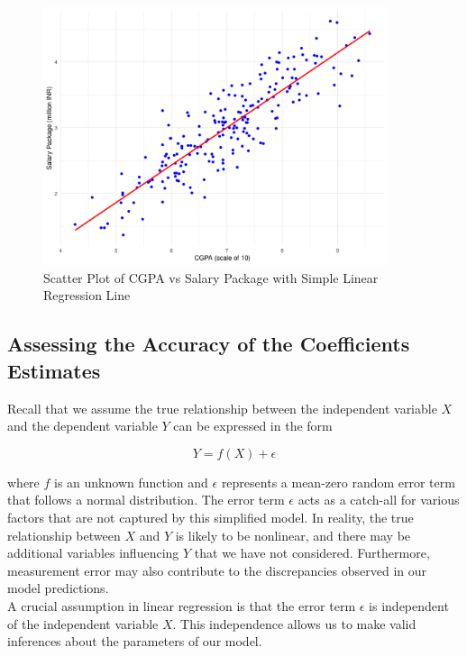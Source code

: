 \begin{figure}[h!]
    \centering
    \includegraphics[width=0.9\textwidth]{chapters/chapter1/plots/scatter_plot_with_lm.png}
    \caption{Scatter Plot of CGPA vs Salary Package with Simple Linear Regression Line}
    \label{fig:scatter_plot_cgpa_salary_with_lm}
\end{figure}

\subsection{Assessing the Accuracy of the Coefficients Estimates}

Recall that we assume the true relationship between the independent variable \(X\) and the dependent variable \(Y\) can be expressed in the form 

\[
Y = f(X) + \epsilon
\]

where \(f\) is an unknown function and \(\epsilon\) represents a mean-zero random error term that follows a normal distribution. The error term \(\epsilon\) acts as a catch-all for various factors that are not captured by this simplified model. In reality, the true relationship between \(X\) and \(Y\) is likely to be nonlinear, and there may be additional variables influencing \(Y\) that we have not considered. Furthermore, measurement error may also contribute to the discrepancies observed in our model predictions.\\

A crucial assumption in linear regression is that the error term \(\epsilon\) is independent of the independent variable \(X\). This independence allows us to make valid inferences about the parameters of our model.\\

